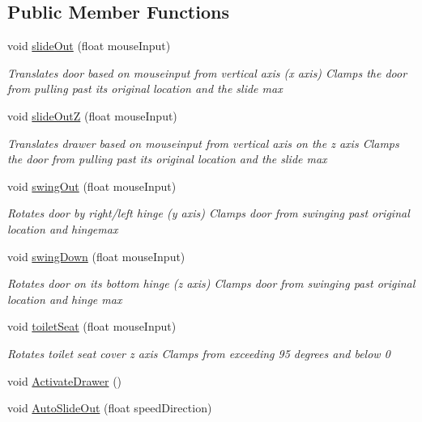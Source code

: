 \subsection*{Public Member Functions}
\begin{DoxyCompactItemize}
\item 
void \hyperlink{class_open_a94d8b8af397b822cf354a1a40d0e35b0}{slide\+Out} (float mouse\+Input)
\begin{DoxyCompactList}\small\item\em Translates door based on mouseinput from vertical axis (x axis) Clamps the door from pulling past its original location and the slide max \end{DoxyCompactList}\item 
void \hyperlink{class_open_ae8738fdd9da4a4b4b41e2179fd92ef08}{slide\+OutZ} (float mouse\+Input)
\begin{DoxyCompactList}\small\item\em Translates drawer based on mouseinput from vertical axis on the z axis Clamps the door from pulling past its original location and the slide max \end{DoxyCompactList}\item 
void \hyperlink{class_open_ab3195a8fe595fb3c84732a6f9ef239b2}{swing\+Out} (float mouse\+Input)
\begin{DoxyCompactList}\small\item\em Rotates door by right/left hinge (y axis) Clamps door from swinging past original location and hingemax \end{DoxyCompactList}\item 
void \hyperlink{class_open_a9da7b24e69deff4d390183a4dcd89fc5}{swing\+Down} (float mouse\+Input)
\begin{DoxyCompactList}\small\item\em Rotates door on its bottom hinge (z axis) Clamps door from swinging past original location and hinge max \end{DoxyCompactList}\item 
void \hyperlink{class_open_a397f7cc8e246c267da71759ca21114fa}{toilet\+Seat} (float mouse\+Input)
\begin{DoxyCompactList}\small\item\em Rotates toilet seat cover z axis Clamps from exceeding 95 degrees and below 0 \end{DoxyCompactList}\item 
void \hyperlink{class_open_a3a6fc35c80de868b34d2198d592297d5}{Activate\+Drawer} ()
\item 
void \hyperlink{class_open_a1aea8521ac5047db6c60b8de9bb786c5}{Auto\+Slide\+Out} (float speed\+Direction)
\end{DoxyCompactItemize}
